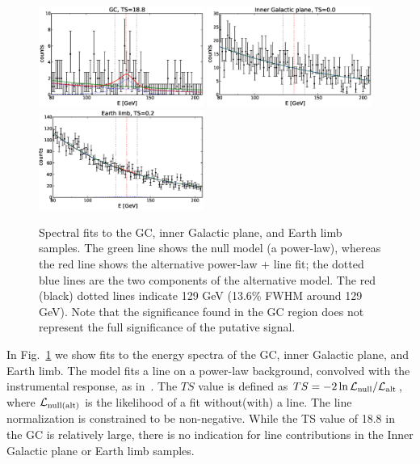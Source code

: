 \documentclass[aps,twocolumn,prd,superscriptaddress,showpacs,nofootinbib,fixfloat]{revtex4}
\begin{document}
\begin{figure}
  \centering
  \includegraphics[width=0.48\textwidth]{plots/counts_GC.eps}
  \includegraphics[width=0.48\textwidth]{plots/counts_IGP.eps}
  \includegraphics[width=0.48\textwidth]{plots/counts_limb.eps}
  \caption{Spectral fits to the GC, inner Galactic plane, and Earth limb
    samples. The green line
  shows the null model (a power-law), whereas the red line
  shows the alternative power-law + line fit; the dotted
  blue lines are the two components of the alternative
  model. The red (black) dotted lines indicate 129 GeV
  (13.6\% FWHM around 129 GeV). 
  Note that the significance found in the GC region does not represent
  the full significance of the putative signal.}
  \label{fig:spectra1}
\end{figure}

In Fig.~\ref{fig:spectra1} we show fits to the energy
spectra of the GC, inner Galactic plane, and Earth limb.  The model fits a
line on a power-law background, convolved with the instrumental response, as
in~\cite{Weniger:2012}. The $TS$ value
is defined as $TS=-2\ln \mathcal{L}_{\rm
null}/\mathcal{L}_{\rm alt}$, where $\mathcal{L}_{\rm
null(alt)}$ is the likelihood of a fit without(with) a line.  The line
normalization is constrained to be non-negative. While the TS value of 18.8 in
the GC is relatively large, there is no indication for line contributions in
the Inner Galactic plane or Earth limb samples.
\end{document}
